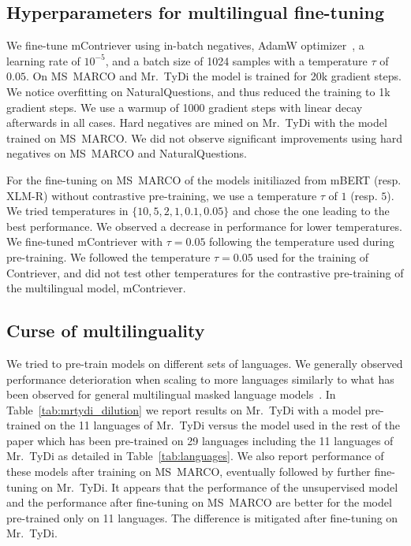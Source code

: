 \documentclass[10pt]{article} %
\def \ours          {Contriever}
\def \oursmulti          {mContriever}
\begin{document}
\subsection{Hyperparameters for multilingual fine-tuning}
\label{appendix:multilingual_finetuning}
We fine-tune mContriever using in-batch negatives, AdamW optimizer~\citep{loshchilov2019decoupled}, a learning rate of $10^{-5}$, and a batch size of 1024 samples with a temperature $\tau$ of $0.05$. On MS~MARCO and Mr.~TyDi the model is trained for 20k gradient steps. We notice overfitting on NaturalQuestions, and thus reduced the training to 1k gradient steps. We use a warmup of 1000 gradient steps with linear decay afterwards in all cases. Hard negatives are mined on Mr.~TyDi with the model trained on MS~MARCO. We did not observe significant improvements using hard negatives on MS~MARCO and NaturalQuestions.

For the fine-tuning on MS~MARCO of the models initiliazed from mBERT (resp. XLM-R) without contrastive pre-training, we use a temperature $\tau$ of $1$ (resp. $5$).
We tried temperatures in $\{10, 5, 2,1,0.1, 0.05\}$ and chose the one leading to the best performance.
We observed a decrease in performance for lower temperatures.
We fine-tuned \oursmulti{} with $\tau = 0.05$ following the temperature used during pre-training.
We followed the temperature $\tau = 0.05$ used for the training of \ours{}, and did not test other temperatures for the contrastive pre-training of the multilingual model, \oursmulti{}.


\subsection{Curse of multilinguality}
\label{appendix:multilingual_dilution}
We tried to pre-train models on different sets of languages.
We generally observed performance deterioration when scaling to more languages similarly to what has been observed for general multilingual masked language models~\citet{conneau2020xlmr}.
In Table~\ref{tab:mrtydi_dilution} we report results on Mr.~TyDi with a model pre-trained on the 11 languages of Mr.~TyDi versus the model used in the rest of the paper which has been pre-trained on 29 languages including the 11 languages of Mr.~TyDi as detailed in Table~\ref{tab:languages}.
We also report performance of these models after training on MS~MARCO, eventually followed by further fine-tuning on Mr.~TyDi.
It appears that the performance of the unsupervised model and the performance after fine-tuning on MS~MARCO are better for the model pre-trained only on 11 languages.
The difference is mitigated after fine-tuning on Mr.~TyDi.
\end{document}
